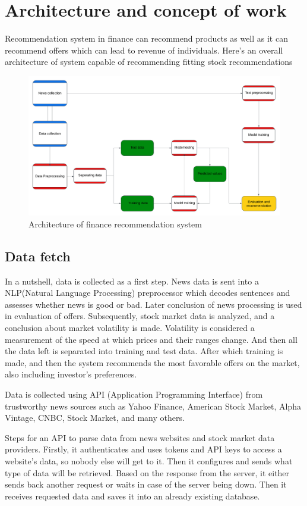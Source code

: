 \documentclass[10pt,twoside,english,a4paper]{article}
\begin{document}
\section{Architecture and concept of work}
Recommendation system in finance can recommend products as well as it can recommend offers which can lead to revenue of individuals. Here's an overall architecture of system capable of recommending fitting stock recommendations

\begin{figure}[h]
\centering
\includegraphics[width=1\textwidth]{architecture_diagram}
\caption{Architecture of finance recommendation system}
\label{fig:Architecture}
\end{figure}

\subsection{Data fetch}
\par In a nutshell, data is collected as a first step. News data is sent into a NLP(Natural Language Processing) preprocessor which decodes sentences and assesses whether news is good or bad. Later conclusion of news processing is used in evaluation of offers. Subsequently, stock market data is analyzed, and a conclusion about market volatility is made. Volatility is considered a measurement of the speed at which prices and their ranges change. And then all the data left is separated into training and test data. After which training is made, and then the system recommends the most favorable offers on the market, also including investor's preferences.
\par Data is collected using API (Application Programming Interface) from trustworthy news sources such as Yahoo Finance, American Stock Market, Alpha Vintage, CNBC, Stock Market, and many others.\cite{stock_comp}
\par Steps for an API to parse data from news websites and stock market data providers. Firstly, it authenticates and uses tokens and API keys to access a website's data, so nobody else will get to it. Then it configures and sends what type of data will be retrieved. Based on the response from the server, it either sends back another request or waits in case of the server being down. Then it receives requested data and saves it into an already existing database.
\end{document}
